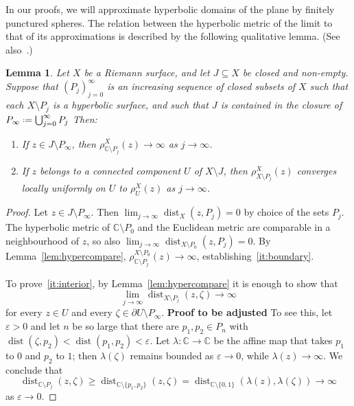 \documentclass[12pt,a4paper,reqno]{amsart}
\theoremstyle{plain}
\newtheorem{lem}[thm]{Lemma}
\renewcommand{\subset}{\subseteq}
\theoremstyle{definition}
\theoremstyle{remark}
\newcommand{\eps}{\varepsilon}
\newcommand{\dist}{\operatorname{dist}}
\numberwithin{equation}{section}
\newcommand \C{\mathbb{C}}
\newcommand*{\defeq}{\mathrel{\vcenter{\baselineskip0.5ex \lineskiplimit0pt
                     \hbox{\scriptsize.}\hbox{\scriptsize.}}}%
                     =}
\newcommand{\lr}[1]{{\color{magenta} #1}}
\begin{document}
 In our proofs, we will approximate 
  hyperbolic domains of the plane by finitely punctured
  spheres. The relation between the 
  hyperbolic metric of the limit to that of its
  approximations is
  described by the 
  following qualitative lemma. (See also~\cite[Lemma 2.2]{ye26}.)
\begin{lem}\label{lem:convergence of densities}
  Let $X$ be a Riemann surface, and let $J\subset X$ be closed and non-empty. Suppose
  that $(P_j)_{j=0}^{\infty}$ is an increasing sequence of
   \lr{closed subsets of $X$} such that each $X\setminus P_j$ is a hyperbolic surface,
   and such that \lr{$J$ is contained in the closure of}
   $P_\infty \defeq \bigcup_{j=0}^{\infty} P_j$ 
   Then: 
    \begin{enumerate}
        \item\label{it:boundary} If $z \in J \setminus P_\infty$, then $\rho_{\C \setminus P_j}^X(z) \to \infty$ as $j \to \infty$.
        \item\label{it:interior} If $z$ belongs to a connected component $U$ of $X \setminus J$, then $\rho_{X \setminus P_j}^X(z)$ converges locally uniformly on $U$ to $\rho_U^X(z)$ as $j \to \infty$.
    \end{enumerate}
\end{lem}

\begin{proof}
    Let $z \in J \setminus P_\infty$. 
     Then 
     $\lim_{j\to\infty}\dist_X(z, P_j)=0$ by choice of
     the sets $P_j$. The hyperbolic metric of $\C\setminus P_0$ and the Euclidean metric are comparable in
     a neighbourhood of $z$, so 
     also $\lim_{j\to\infty} \dist_{X\setminus P_0}(z,P_j)=0$. By Lemma~\ref{lem:hypercompare},
     $\rho_{\C\setminus P_j}^{X\setminus P_0}(z)\to\infty$, establishing~\eqref{it:boundary}. 

    To prove~\ref{it:interior}, by Lemma~\ref{lem:hypercompare} it is enough to
    show that 
     \[ \lim_{j\to\infty}\dist_{X\setminus P_j}(z,\zeta)\to\infty \] for every $z\in U$ and every
     $\zeta\in\partial U\setminus P_{\infty}$. \textbf{Proof to be adjusted}
     To see this, let $\eps>0$ and let $n$ be 
     so large that there are $p_1,p_2\in P_n$ with
     $\dist(\zeta,p_2)<\dist(p_1,p_2)<\eps$. Let
     $\lambda\colon \C\to\C$ be the affine map that
     takes $p_1$ to $0$ and $p_2$ to $1$; then
     $\lambda(\zeta)$ remains bounded as $\eps\to 0$, while
     $\lambda(z)\to\infty$. We conclude that
     \[ \dist_{\C\setminus P_j}(z,\zeta) \geq 
         \dist_{\C\setminus \{p_1,p_2\}}(z,\zeta) =
         \dist_{\C\setminus\{0,1\}}(\lambda(z),\lambda(\zeta)) \to\infty \] 
         as $\eps\to 0$. 
\end{proof}
\end{document}
